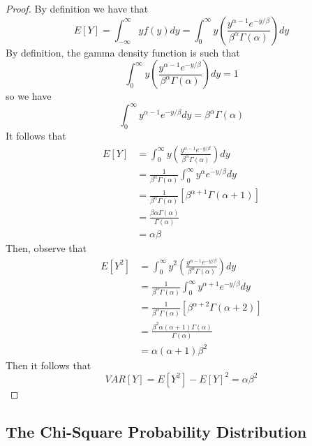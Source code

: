 \documentclass[12pt, a4paper, twoside, openright, titlepage]{book}
\begin{document}
\begin{proof}{}{}
    By definition we have that \begin{equation*}
        E[Y] = \int_{-\infty}^{\infty}yf(y)dy = \int_0^{\infty}y\left(\frac{y^{\alpha - 1}e^{-y/\beta}}{\beta^{\alpha}\Gamma(\alpha)}\right)dy
    \end{equation*}
    By definition, the gamma density function is such that \begin{equation*}
        \int_0^{\infty}y\left(\frac{y^{\alpha - 1}e^{-y/\beta}}{\beta^{\alpha}\Gamma(\alpha)}\right)dy = 1
    \end{equation*}
    so we have \begin{equation*}
        \int_0^{\infty}y^{\alpha -1}e^{-y/\beta}dy = \beta^{\alpha}\Gamma(\alpha)
    \end{equation*}
    It follows that \begin{align*}
        E[Y] &=  \int_0^{\infty}y\left(\frac{y^{\alpha - 1}e^{-y/\beta}}{\beta^{\alpha}\Gamma(\alpha)}\right)dy \\
        &= \frac{1}{\beta^{\alpha}\Gamma(\alpha)}\int_0^{\infty}y^{\alpha}e^{-y/\beta}dy \\
        &= \frac{1}{\beta^{\alpha}\Gamma(\alpha)}\left[\beta^{\alpha+1}\Gamma(\alpha+1)\right] \\
        &= \frac{\beta\alpha\Gamma(\alpha)}{\Gamma(\alpha)} \\
        &= \alpha\beta
    \end{align*}
    Then, observe that \begin{align*}
        E[Y^2] &= \int_0^{\infty}y^2\left(\frac{y^{\alpha - 1}e^{-y/\beta}}{\beta^{\alpha}\Gamma(\alpha)}\right)dy \\
        &= \frac{1}{\beta^{\alpha}\Gamma(\alpha)}\int_0^{\infty}y^{\alpha+1}e^{-y/\beta}dy \\
        &= \frac{1}{\beta^{\alpha}\Gamma(\alpha)}\left[\beta^{\alpha+2}\Gamma(\alpha+2)\right] \\
        &= \frac{\beta^2\alpha(\alpha+1)\Gamma(\alpha)}{\Gamma(\alpha)} \\
        &= \alpha(\alpha+1)\beta^2
    \end{align*}
    Then it follows that \begin{equation*}
        VAR[Y] = E[Y^2]-E[Y]^2 = \alpha\beta^2
    \end{equation*}
\end{proof}


\subsection{The Chi-Square Probability Distribution}
\end{document}

